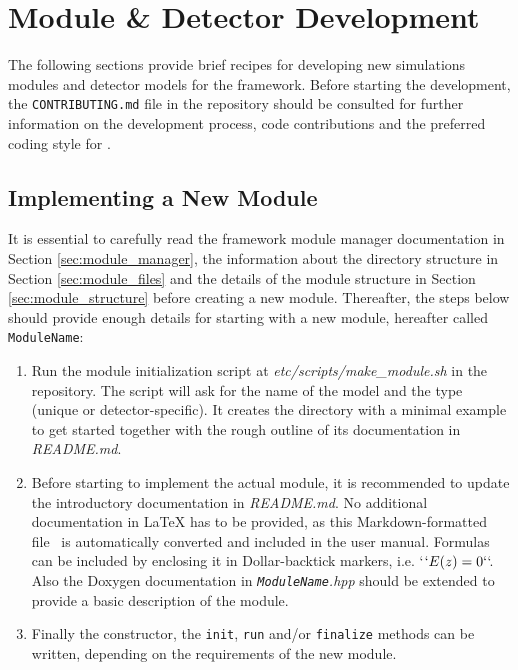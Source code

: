 \section{Module \& Detector Development}

The following sections provide brief recipes for developing new simulations modules and detector models for the \apsq framework.
Before starting the development, the \texttt{CONTRIBUTING.md} file in the repository should be consulted for further information on the development process, code contributions and the preferred coding style for \apsq.

\subsection{Implementing a New Module}
\label{sec:building_new_module}

It is essential to carefully read the framework module manager documentation in Section \ref{sec:module_manager}, the information about the directory structure in Section \ref{sec:module_files} and the details of the module structure in Section \ref{sec:module_structure} before creating a new module.
Thereafter, the steps below should provide enough details for starting with a new module, hereafter called \texttt{ModuleName}:
\begin{enumerate}
\item Run the module initialization script at \textit{etc/scripts/make\_module.sh} in the repository.
The script will ask for the name of the model and the type (unique or detector-specific).
It creates the directory with a minimal example to get started together with the rough outline of its documentation in \textit{README.md}.
\item Before starting to implement the actual module, it is recommended to update the introductory documentation in \textit{README.md}.
No additional documentation in LaTeX has to be provided, as this Markdown-formatted file~\cite{markdown} is automatically converted and included in the user manual.
Formulas can be included by enclosing it in Dollar-backtick markers, i.e. `$` E(z) = 0`$`.
Also the Doxygen documentation in \textit{\texttt{ModuleName}.hpp} should be extended to provide a basic description of the module.
\item Finally the constructor, the \texttt{init}, \texttt{run} and/or \texttt{finalize} methods can be written, depending on the requirements of the new module.
\end{enumerate}

